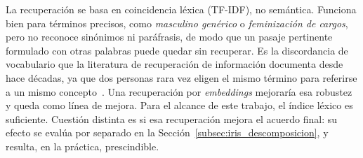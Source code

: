 La recuperación se basa en coincidencia léxica (TF-IDF), no semántica. Funciona
bien para términos precisos, como \textit{masculino genérico} o \textit{feminización de
cargos}, pero no reconoce sinónimos ni paráfrasis, de modo que un pasaje
pertinente formulado con otras palabras puede quedar sin recuperar. Es la
discordancia de vocabulario que la literatura de recuperación de información
documenta desde hace décadas, ya que dos personas rara vez eligen el mismo término
para referirse a un mismo concepto~\cite{furnas1987}. Una
recuperación por \textit{embeddings} mejoraría esa robustez y queda como línea de
mejora. Para el
alcance de este trabajo, el índice léxico es suficiente. Cuestión distinta es si esa recuperación mejora el acuerdo final: su
efecto se evalúa por separado en la Sección~\ref{subsec:iris_descomposicion}, y
resulta, en la práctica, prescindible.

